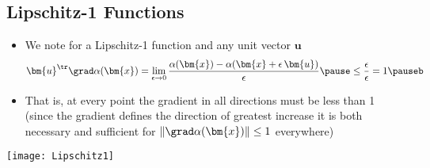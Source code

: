 
\begin{slide}
\section[-2]{Lipschitz-1 Functions}

\begin{PauseHighLight}
  \begin{itemize}
  \item We note for a Lipschitz-1 function and any unit vector $\bm{u}$
    \begin{align*}
      \bm{u}^\tr\grad \alpha(\bm{x}) = \lim_{\epsilon \rightarrow 0}
      \frac{\alpha(\bm{x})-\alpha(\bm{x}+\epsilon \,
      \bm{u})}{\epsilon} \pause
      \leq \frac{\epsilon}{\epsilon} = 1 \pauseb
    \end{align*}
  \item That is, at every point the gradient in all directions must be
    less than 1\pause{} (since the gradient defines the direction of greatest
    increase it is both necessary and sufficient for $\|\grad
    \alpha(\bm{x})\|\leq1$ everywhere)\pauseb
  \end{itemize}
  \begin{center}
    \texttt{[image: Lipschitz1]}\pause
  \end{center}
\end{PauseHighLight}
  

\end{slide}



